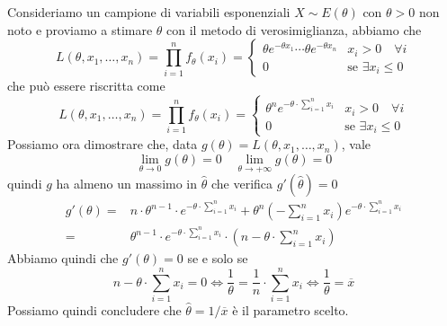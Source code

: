 \begin{example}
	Consideriamo un campione di variabili esponenziali $X \sim E(\theta)$ con $\theta > 0$ non noto
	e proviamo a stimare $\theta$ con il metodo di verosimiglianza, abbiamo che
	\[
		L(\theta, x_1, \dots, x_n) = \prod_{i=1}^n f_\theta(x_i) =
		\begin{cases}
			\theta e^{-\theta x_1} \cdots \theta e^{-\theta x_n} & x_i > 0 \quad \forall i       \\
			0                                                    & \text{se } \exists x_i \leq 0
		\end{cases}
	\]
	che può essere riscritta come
	\[
		L(\theta, x_1, \dots, x_n) =
		\prod_{i=1}^n f_\theta(x_i) =
		\begin{cases}
			\theta^n e^{-\theta \cdot \sum_{i=1}^{n} x_i} & x_i > 0 \quad \forall i       \\
			0                                             & \text{se } \exists x_i \leq 0
		\end{cases}
	\]
	Possiamo ora dimostrare che, data $g(\theta) = L(\theta, x_1, \dots, x_n)$, vale
	\[ \lim_{\theta \to 0} g(\theta) = 0 \quad \lim_{\theta \to +\infty} g(\theta) = 0 \]
	quindi $g$ ha almeno un massimo in $\hat{\theta}$ che verifica $g'(\hat{\theta}) = 0$
	\begin{align*}
		g'(\theta) = & n \cdot \theta^{n-1} \cdot e^{-\theta \cdot \sum_{i=1}^n x_i} +
		\theta^n \left( -\sum_{i=1}^{n} x_i \right) e^{-\theta \cdot \sum_{i=1}^{n} x_i} \\
		=            & \theta^{n-1} \cdot e^{-\theta \cdot \sum_{i=1}^{n} x_i} \cdot
		\left(n - \theta \cdot \sum_{i=1}^{n} x_i \right)
	\end{align*}
	Abbiamo quindi che $g'(\theta) = 0$ se e solo se
	\[
		n - \theta \cdot \sum_{i=1}^{n} x_i = 0 \iff
		\frac{1}{\theta} = \frac{1}{n} \cdot \sum_{i=1}^{n} x_i \iff
		\frac{1}{\theta} = \overline{x}
	\]
	Possiamo quindi concludere che $\hat{\theta} = 1 / \overline{x}$ è il parametro scelto.
\end{example}


